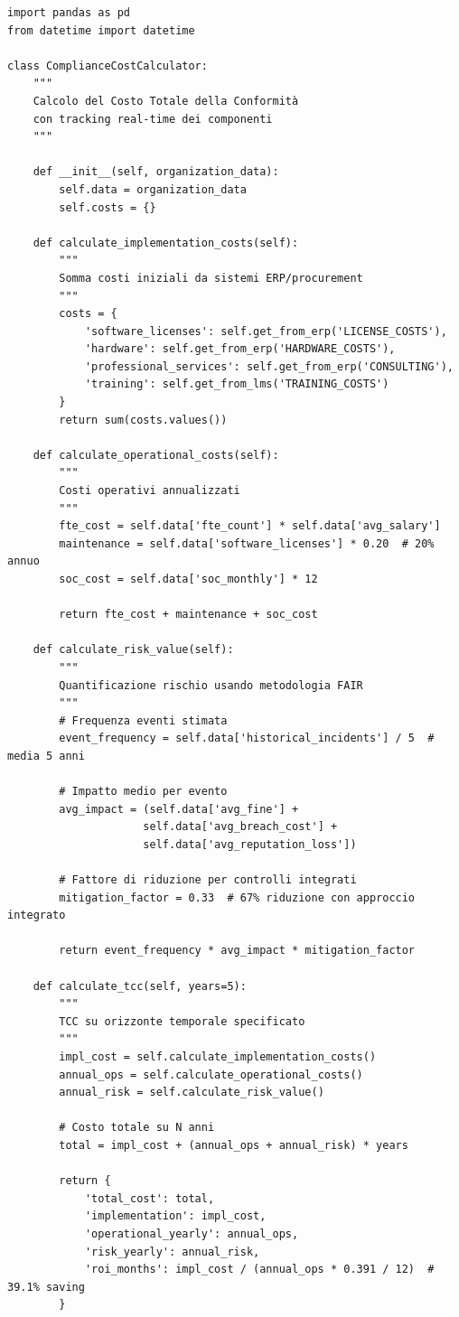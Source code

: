\begin{lstlisting}[caption={Dashboard Python per Calcolo TCC},label={lst:tcc_dashboard}]
import pandas as pd
from datetime import datetime

class ComplianceCostCalculator:
    """
    Calcolo del Costo Totale della Conformità 
    con tracking real-time dei componenti
    """
    
    def __init__(self, organization_data):
        self.data = organization_data
        self.costs = {}
        
    def calculate_implementation_costs(self):
        """
        Somma costi iniziali da sistemi ERP/procurement
        """
        costs = {
            'software_licenses': self.get_from_erp('LICENSE_COSTS'),
            'hardware': self.get_from_erp('HARDWARE_COSTS'),
            'professional_services': self.get_from_erp('CONSULTING'),
            'training': self.get_from_lms('TRAINING_COSTS')
        }
        return sum(costs.values())
    
    def calculate_operational_costs(self):
        """
        Costi operativi annualizzati
        """
        fte_cost = self.data['fte_count'] * self.data['avg_salary']
        maintenance = self.data['software_licenses'] * 0.20  # 20% annuo
        soc_cost = self.data['soc_monthly'] * 12
        
        return fte_cost + maintenance + soc_cost
    
    def calculate_risk_value(self):
        """
        Quantificazione rischio usando metodologia FAIR
        """
        # Frequenza eventi stimata
        event_frequency = self.data['historical_incidents'] / 5  # media 5 anni
        
        # Impatto medio per evento
        avg_impact = (self.data['avg_fine'] + 
                     self.data['avg_breach_cost'] + 
                     self.data['avg_reputation_loss'])
        
        # Fattore di riduzione per controlli integrati
        mitigation_factor = 0.33  # 67% riduzione con approccio integrato
        
        return event_frequency * avg_impact * mitigation_factor
    
    def calculate_tcc(self, years=5):
        """
        TCC su orizzonte temporale specificato
        """
        impl_cost = self.calculate_implementation_costs()
        annual_ops = self.calculate_operational_costs()
        annual_risk = self.calculate_risk_value()
        
        # Costo totale su N anni
        total = impl_cost + (annual_ops + annual_risk) * years
        
        return {
            'total_cost': total,
            'implementation': impl_cost,
            'operational_yearly': annual_ops,
            'risk_yearly': annual_risk,
            'roi_months': impl_cost / (annual_ops * 0.391 / 12)  # 39.1% saving
        }
\end{lstlisting}

